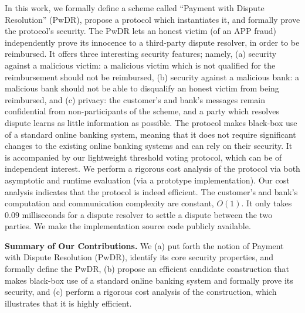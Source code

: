 In this work, we formally define a scheme called ``Payment with Dispute Resolution'' (PwDR),  propose a protocol which instantiates it, and formally prove the protocol's security.  The PwDR lets an honest victim (of an APP fraud)  independently prove its innocence to a third-party dispute resolver, in order to be reimbursed.  It offers three interesting security features; namely, (a) security against a malicious victim: a malicious victim  which is not qualified for the reimbursement should not be reimbursed, (b) security against a malicious bank: a malicious bank should not be able to disqualify an honest victim  from being reimbursed, and (c) privacy: the customer’s and bank’s messages remain confidential from non-participants of the scheme, and a party which resolves dispute  learns as little information as possible.  The  protocol makes black-box use of a standard  online banking system, meaning that it does not require significant changes to the existing online banking systems and can rely on their security. It is accompanied by our lightweight threshold voting protocol, which can be of independent interest. We perform a rigorous cost analysis of the protocol via both asymptotic and runtime  evaluation (via a prototype implementation). Our cost analysis indicates that the protocol is indeed efficient. The customer's and bank's computation and communication complexity are constant, $O(1)$. It only takes $0.09$ milliseconds for a dispute resolver to settle a dispute between the two parties. We  make  the implementation source code publicly available.
  





\vspace{2mm}

\noindent\textbf{Summary of Our Contributions.} We (a) put forth the notion of Payment with Dispute Resolution (PwDR), identify its core security properties, and  formally define the PwDR, (b) propose an efficient candidate construction that makes black-box use of a standard  online banking system and formally prove its security, and (c) perform a rigorous cost analysis of the construction, which illustrates that it is highly efficient.     





